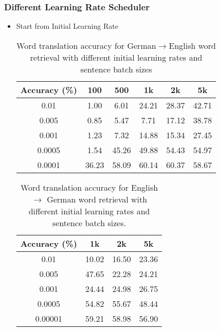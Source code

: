 \subsubsection{Different Learning Rate Scheduler}
\begin{itemize}
	\item Start from Initial Learning Rate
		\begin{table}[H]
			\centering
			\begin{tabular}{cccccc}
				\hline
				Accuracy (\%) & 100   & 500   & 1k    & 2k    & 5k    \\ \hline
				0.01          & 1.00  & 6.01  & 24.21 & 28.37 & 42.71 \\ \hline
				0.005         & 0.85  & 5.47  & 7.71  & 17.12 & 38.78 \\ \hline
				0.001         & 1.23  & 7.32  & 14.88 & 15.34 & 27.45 \\ \hline
				0.0005        & 1.54  & 45.26 & 49.88 & 54.43 & 54.97 \\ \hline
				0.0001        & 36.23 & 58.09 & 60.14 & 60.37 & 58.67 \\ \hline
			\end{tabular}
		\caption{Word translation accuracy for German$\rightarrow$English word retrieval with different initial learning rates and sentence batch sizes}
		\end{table}
		\begin{table}[H]
			\centering
			\begin{tabular}{cccc}
				\hline
				Accuracy (\%) & 1k   & 2k   & 5k      \\ \hline
				0.01          & 10.02  & 16.50  & 23.36 \\ \hline
				0.005       & 47.65 & 22.28 & 24.21 \\ \hline
				0.001        & 24.44 & 24.98 & 26.75 \\ \hline
				0.0005          & 54.82  & 55.67  & 48.44 \\ \hline
				0.00001        & 59.21 & 58.98 & 56.90 \\ \hline
			\end{tabular}
		 \caption{Word translation accuracy for English $\rightarrow$ German word retrieval with different initial learning rates and sentence batch sizes.}
		\end{table}	

\end{itemize}
